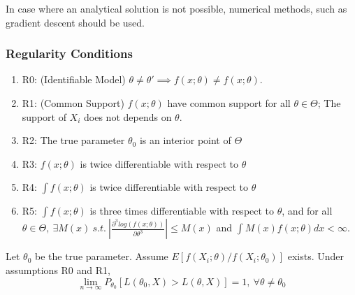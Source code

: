 \documentclass[9pt]{article}
\newenvironment{theorem}[2][Theorem]{\begin{trivlist}
\item[\hskip \labelsep {\bfseries #1}\hskip \labelsep {\bfseries #2}]}{\end{trivlist}}
\begin{document}
In case where an analytical solution is not possible, numerical methods, such as gradient descent should be used. \newline

\subsubsection{Regularity Conditions}
\begin{enumerate}
    \item R0: (Identifiable Model) $\theta \not = \theta' \implies f(x;\theta) \not = f(x;\theta)$.
    \item R1: (Common Support) $f(x;\theta)$ have common support for all $\theta \in \Theta$; The support of $X_i$ does not depends on $\theta$.
    \item R2: The true parameter $\theta_0$ is an interior point of $\Theta$
    \item R3: $f(x;\theta)$ is twice differentiable with respect to $\theta$
    \item R4: $\int f(x;\theta)$ is twice differentiable with respect to $\theta$
    \item R5: $\int f(x;\theta)$ is three times differentiable with respect to $\theta$, and for all $\theta \in \Theta,\ \exists M(x)\ s.t.\ |\frac{\partial^3log(f(x;\theta))}{\partial \theta^3}| \le M(x)$ and $\int M(x)f(x;\theta)dx < \infty$.
\end{enumerate}

\begin{theorem}{Probability of Maximum Likelihood}

 Let $\theta_0$ be the true parameter. Assume $E[f(X_i;\theta)/f(X_i;\theta_0)]$ exists. Under assumptions R0 and R1,
$$
    \lim_{n\to \infty} P_{\theta_0}[L(\theta_0, X) > L(\theta, X)] = 1,\ \forall \theta \not = \theta_0
$$
\end{theorem} 
\end{document}
